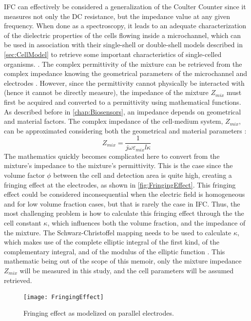 IFC can effectively be considered a generalization of the Coulter Counter since it measures not only the DC resistance, but the impedance value at any given frequency. When done as a spectroscopy, it leads to an adequate characterization of the dielectric properties of the cells flowing inside a microchannel, which can be used in association with their single-shell or double-shell models described in \autoref{sec:CellModel} to retrieve some important characteristics of single-celled organisms. \cite{Opitz2019, Cheung2010, Xu2016}. The complex permittivity of the mixture can be retrieved from the complex impedance knowing the geometrical parameters of the microchannel and electrodes \cite{Sun2010,Xu2016}. However, since the permittivity cannot physically be interacted with (hence it cannot be directly measure), the impedance of the mixture $Z_{mix}$ must first be acquired and converted to a permittivity using mathematical functions. As described before in \autoref{chap:Biosensors}, an impedance depends on geometrical and material factors. The complex impedance of the cell-medium system, $Z_{mix}$, can be approximated considering both the geometrical and material parameters \cite{Xu2016,morgan2006single}:
\begin{equation}
\label{eq:Zmixture}
Z_{mix}=\frac{1}{j \omega \varepsilon_{mix} l \kappa}
\end{equation}
The mathematics quickly becomes complicated here to convert from the mixture’s impedance to the mixture’s permittivity. This is the case since the volume factor $\phi$ between the cell and detection area is quite high, creating a fringing effect at the electrodes, as shown in \autoref{fig:FringingEffect}. This fringing effect could be considered inconsequential when the electric field is homogeneous and for low volume fraction cases, but that is rarely the case in IFC. Thus, the most challenging problem is how to calculate this fringing effect through the the cell constant $\kappa$, which influences both the volume fraction, and the impedance of the mixture. The Schwarz-Christoffel mapping \cite{Schwarz1869, Christoffel1867} needs to be used to calculate $\kappa$, which makes use of the complete elliptic integral of the first kind, of the complementary integral, and of the modulus of the elliptic function \cite{Xu2016,morgan2006single}. This mathematic being out of the scope of this memoir, only the mixture impedance $Z_{mix}$ will be measured in this study, and the cell parameters will be assumed retrieved. \par
\begin{figure}[h]
    \centering
    \texttt{[image: FringingEffect]}
    \caption{Fringing effect as modelized on parallel electrodes. \citep{FringingEffect}}
    \label{fig:FringingEffect}
\end{figure}

